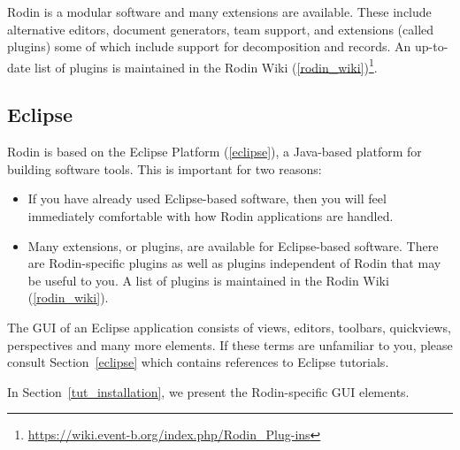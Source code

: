 Rodin is a modular software and many extensions are available.  These include alternative editors, document generators, team support, and extensions (called plugins) some of which include support for decomposition and records.  An up-to-date list of plugins is maintained in the Rodin Wiki (\ref{rodin_wiki})\footnote{\url{https://wiki.event-b.org/index.php/Rodin_Plug-ins}}.

\subsection{Eclipse} 
\label{tut_eclipse}

Rodin is based on the Eclipse Platform (\ref{eclipse}), a Java-based platform for building software tools.  This is important for two reasons:
\begin{itemize}
	\item If you have already used Eclipse-based software, then you will feel immediately comfortable with how Rodin applications are handled.
	\item Many extensions, or plugins, are available for Eclipse-based software. There are Rodin-specific plugins as well as plugins independent of Rodin that may be useful to you.  A list of plugins is maintained in the Rodin Wiki (\ref{rodin_wiki}).
\end{itemize}

The GUI of an Eclipse application consists of views, editors, toolbars, quickviews, perspectives and many more elements.  If these terms are unfamiliar to you, please consult Section~\ref{eclipse} which contains references to Eclipse tutorials.

In Section~\ref{tut_installation}, we present the Rodin-specific GUI elements.

